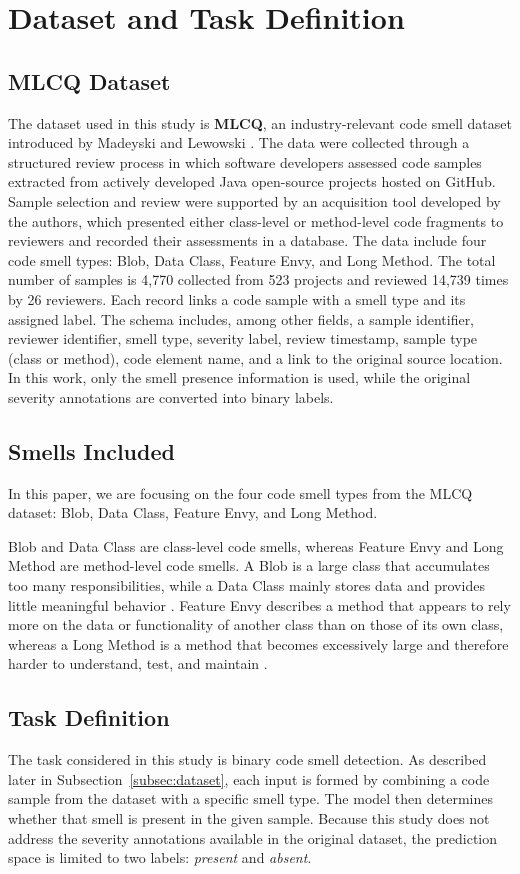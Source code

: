 \section{Dataset and Task Definition}
\label{sec:dataset-task}

\subsection{MLCQ Dataset}
\label{subsec:mlcq-dataset}
The dataset used in this study is \textbf{MLCQ}, an industry-relevant code smell dataset introduced by Madeyski and Lewowski \cite{madeyski2020mlcq}. The data were collected through a structured review process in which software developers assessed code samples extracted from actively developed Java open-source projects hosted on GitHub. Sample selection and review were supported by an acquisition tool developed by the authors, which presented either class-level or method-level code fragments to reviewers and recorded their assessments in a database. The data include four code smell types: Blob, Data Class, Feature Envy, and Long Method. The total number of samples is 4,770 collected from 523 projects and reviewed 14,739 times by 26 reviewers. Each record links a code sample with a smell type and its assigned label. The schema includes, among other fields, a sample identifier, reviewer identifier, smell type, severity label, review timestamp, sample type (class or method), code element name, and a link to the original source location. In this work, only the smell presence information is used, while the original severity annotations are converted into binary labels.

\subsection{Smells Included}
\label{subsec:smells-included}
In this paper, we are focusing on the four code smell types from the MLCQ dataset: Blob, Data Class, Feature Envy, and Long Method.

Blob and Data Class are class-level code smells, whereas Feature Envy and Long Method are method-level code smells. A Blob is a large class that accumulates too many responsibilities, while a Data Class mainly stores data and provides little meaningful behavior \cite{Jerzyk2023}. Feature Envy describes a method that appears to rely more on the data or functionality of another class than on those of its own class, whereas a Long Method is a method that becomes excessively large and therefore harder to understand, test, and maintain \cite{Jerzyk2023}.

\subsection{Task Definition}
\label{subsec:task-definition}
The task considered in this study is binary code smell detection. As described later in Subsection~\ref{subsec:dataset}, each input is formed by combining a code sample from the dataset with a specific smell type. The model then determines whether that smell is present in the given sample. Because this study does not address the severity annotations available in the original dataset, the prediction space is limited to two labels: \textit{present} and \textit{absent}.